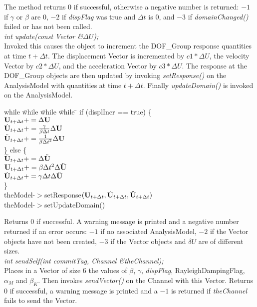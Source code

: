 The method returns $0$ if successful, otherwise a negative number is
returned: $-1$ if $\gamma$ or $\beta$ are $0$, $-2$ if {\em dispFlag}
was true and $\Delta t$ is $0$, and $-3$ if {\em domainChanged()}
failed or has not been called. \\

{\em int update(const Vector \&$\Delta U$);} \\
Invoked this causes the object to increment the DOF\_Group
response quantities at time $t + \Delta t$. The displacement Vector is  
incremented by $ c1 * \Delta U$, the velocity Vector by $
c2 * \Delta U$, and the acceleration Vector by $c3 * \Delta U$.
The response at the DOF\_Group objects are then updated by invoking
{\em setResponse()} on the AnalysisModel with quantities at time $t +
\Delta t$. Finally {\em updateDomain()} is invoked on the 
AnalysisModel. 
\begin{tabbing}
while \= while \= while \= while \= \kill
\>\> if (displIncr == true) \{ \\
\>\>\> $ {\bf U}_{t + \Delta t} += \Delta {\bf U}$ \\
\>\>\> $ \dot {{\bf U}}_{t + \Delta t} += \frac{\gamma}{\beta \Delta t} \Delta {\bf U} $\\
\>\>\> $ \ddot {{\bf U}}_{t + \Delta t} += \frac{1}{\beta {\Delta t}^2} \Delta
{\bf U} $\\
\>\> \} else \{ \\
\>\>\> $ \ddot{\bf U}_{t + \Delta t} += \Delta \ddot{\bf U}$ \\
\>\>\> $ {\bf U}_{t + \Delta t} += \beta \Delta t^2 \Delta \ddot{\bf U} $\\
\>\>\> $ \dot{\bf U}_{t + \Delta t} += \gamma \Delta t \Delta \ddot{\bf U} $\\
\>\> \} \\
\>\> theModel-$>$setResponse$({\bf U}_{t + \Delta t}, \dot{\bf U}_{t+\Delta t},
\ddot{\bf U}_{t+\Delta t})$ \\
\>\> theModel-$>$setUpdateDomain()
\end{tabbing}
Returns $0$ if successful. A warning message is printed and a negative number
returned if an error occurs: $-1$ if no associated AnalysisModel, $-2$
if the Vector objects have not been created, $-3$ if the Vector
objects and $\delta U$ are of different sizes. \\

{\em int sendSelf(int commitTag, Channel \&theChannel); } \\ 
Places in a Vector of size 6 the values of $\beta$, $\gamma$, {\em
dispFlag}, RayleighDampingFlag, $\alpha_M$ and $\beta_K$.  Then
invokes {\em sendVector()} on the Channel with this Vector. Returns
$0$ if successful, a warning message is printed and a $-1$ is 
returned if {\em theChannel} fails to send the Vector. \\ 

